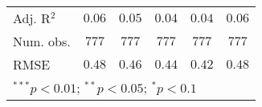 \begin{table}
\begin{center}
\begin{tabular}{l c c c c c}
Adj. R$^2$    & $0.06$        & $0.05$        & $0.04$        & $0.04$        & $0.06$        \\
Num. obs.     & $777$         & $777$         & $777$         & $777$         & $777$         \\
RMSE          & $0.48$        & $0.46$        & $0.44$        & $0.42$        & $0.48$        \\
\bottomrule
\multicolumn{6}{l}{\scriptsize{$^{***}p<0.01$; $^{**}p<0.05$; $^{*}p<0.1$}}
\end{tabular}
\label{tab_emo_na}
\end{center}
\end{table}
